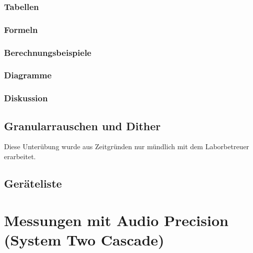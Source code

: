 \documentclass[12pt,a4paper,ngerman]{article}
\begin{document}
\subsubsection{Tabellen}

\subsubsection{Formeln}

\subsubsection{Berechnungsbeispiele}

\subsubsection{Diagramme}

\subsubsection{Diskussion}

%
%

\subsection{Granularrauschen und Dither}
Diese Unterübung wurde aus Zeitgründen nur mündlich mit dem Laborbetreuer erarbeitet. 

\subsection{Geräteliste}



%
%

\section{Messungen mit Audio Precision (System Two Cascade)}
\end{document}
